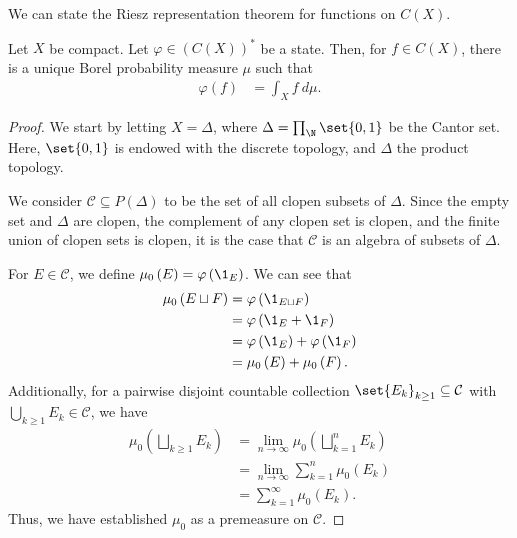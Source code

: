 \documentclass[10pt]{mypackage}
\begin{document}
We can state the Riesz representation theorem for functions on $C(X)$.
\begin{theorem}
  Let $X$ be compact. Let $\varphi\in \left(C(X)\right)^{\ast}$ be a state. Then, for $f\in C(X)$, there is a unique Borel probability measure $\mu$ such that
  \begin{align*}
    \varphi(f) &= \int_{X} f\:d\mu.
  \end{align*}
\end{theorem}
\begin{proof}
  We start by letting $X = \Delta$, where $\Delta = \prod_{\N}\set{0,1}$ be the Cantor set. Here, $\set{0,1}$ is endowed with the discrete topology, and $\Delta$ the product topology.\newline

  We consider $\mathcal{C}\subseteq P(\Delta)$ to be the set of all clopen subsets of $\Delta$. Since the empty set and $\Delta$ are clopen, the complement of any clopen set is clopen, and the finite union of clopen sets is clopen, it is the case that $\mathcal{C}$ is an algebra of subsets of $\Delta$.\newline

  For $E\in \mathcal{C}$, we define $\mu_0\left(E\right) = \varphi\left(\1_{E}\right)$. We can see that
  \begin{align*}
    \mu_0\left(E\sqcup F\right) &= \varphi\left(\1_{E\sqcup F}\right)\\
                              &= \varphi\left(\1_{E} + \1_{F}\right)\\
                              &= \varphi\left(\1_{E}\right) + \varphi\left(\1_{F}\right)\\
                              &= \mu_0\left(E\right) + \mu_{0}\left(F\right).
  \end{align*}
  Additionally, for a pairwise disjoint countable collection $\set{E_k}_{k\geq 1}\subseteq \mathcal{C}$ with $\bigcup_{k\geq 1}E_k\in \mathcal{C}$, we have
  \begin{align*}
    \mu_0\left(\bigsqcup_{k\geq 1}E_k\right) &= \lim_{n\rightarrow\infty}\mu_0\left(\bigsqcup_{k=1}^{n}E_k\right)\\
                                             &= \lim_{n\rightarrow\infty}\sum_{k=1}^{n}\mu_0\left(E_k\right)\\
                                             &= \sum_{k=1}^{\infty}\mu_0\left(E_k\right).
  \end{align*}
  Thus, we have established $\mu_0$ as a premeasure on $\mathcal{C}$.\newline


\end{proof}
\end{document}
